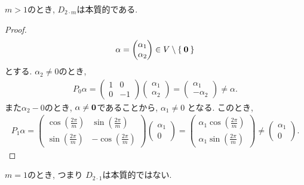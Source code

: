 \begin{prop}
$m>1$のとき, $D_{2\cdot m}$は本質的である.
\end{prop}
\begin{proof}
  \begin{align*}
    \alpha=\begin{pmatrix}
      \alpha_1 \\
      \alpha_2
    \end{pmatrix}\in V\setminus\Set{\boldsymbol{0}}
  \end{align*}
  とする.
  $\alpha_2\neq 0$のとき,
  \begin{align*}
    P_0 \alpha =
    \begin{pmatrix}
      1&0\\
      0&-1
    \end{pmatrix}  
    \begin{pmatrix}
      \alpha_1\\
      \alpha_2
    \end{pmatrix}
    =
    \begin{pmatrix}
      \alpha_1\\
      -\alpha_2
    \end{pmatrix}
    \neq \alpha.
  \end{align*}
  また$\alpha_2-0$のとき,
  $\alpha\neq \boldsymbol{0}$であることから,
  $\alpha_1\neq 0$ となる.
  このとき,
  \begin{align*}
    P_1 \alpha =
    \begin{pmatrix}
      \cos(\frac{2\pi}{m})&\sin(\frac{2\pi}{m})\\
      \sin(\frac{2\pi}{m})&-\cos(\frac{2\pi}{m})
    \end{pmatrix}  
    \begin{pmatrix}
      \alpha_1\\
      0
    \end{pmatrix}
    =
    \begin{pmatrix}
      \alpha_1\cos(\frac{2\pi}{m})\\
      \alpha_1\sin(\frac{2\pi}{m})
    \end{pmatrix}  
    \neq
    \begin{pmatrix}
      \alpha_1\\
      0
    \end{pmatrix}
    .
  \end{align*}
\end{proof}
\begin{prop}
  $m=1$のとき, つまり $D_{2\cdot 1}$は本質的ではない.
\end{prop}

